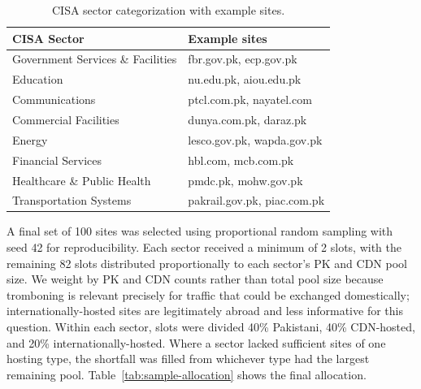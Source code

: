 \documentclass[sigconf,anonymous,10pt]{acmart}
\begin{document}
\begin{table}[t]
\caption{CISA sector categorization with example sites.}
\label{tab:cisa-sectors}
\begin{tabular}{ll}
\toprule
\textbf{CISA Sector} & \textbf{Example sites} \\
\midrule
Government Services \& Facilities & fbr.gov.pk, ecp.gov.pk \\
Education                         & nu.edu.pk, aiou.edu.pk \\
Communications                    & ptcl.com.pk, nayatel.com \\
Commercial Facilities             & dunya.com.pk, daraz.pk \\
Energy                            & lesco.gov.pk, wapda.gov.pk \\
Financial Services                & hbl.com, mcb.com.pk \\
Healthcare \& Public Health       & pmdc.pk, mohw.gov.pk \\
Transportation Systems            & pakrail.gov.pk, piac.com.pk \\
\bottomrule
\end{tabular}
\end{table}

A final set of 100 sites was selected using proportional random sampling with seed 42 for reproducibility. Each sector received a minimum of 2 slots, with the remaining 82 slots distributed proportionally to each sector's PK and CDN pool size. We weight by PK and CDN counts rather than total pool size because tromboning is relevant precisely for traffic that could be exchanged domestically; internationally-hosted sites are legitimately abroad and less informative for this question. Within each sector, slots were divided 40\% Pakistani, 40\% CDN-hosted, and 20\% internationally-hosted. Where a sector lacked sufficient sites of one hosting type, the shortfall was filled from whichever type had the largest remaining pool. Table~\ref{tab:sample-allocation} shows the final allocation.
\end{document}
